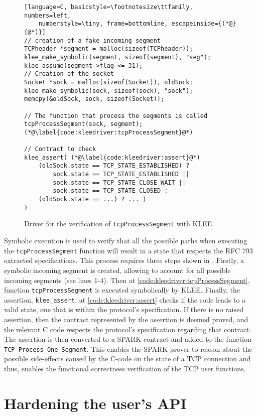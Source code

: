\documentclass[conference]{IEEEtran}
\def\spark#1{\lstinline[language=Ada]{#1}}
\begin{document}
\begin{figure}
\begin{lstlisting}[language=C, basicstyle=\footnotesize\ttfamily, numbers=left,
    numberstyle=\tiny, frame=bottomline, escapeinside={(*@}{@*)}]
// creation of a fake incoming segment
TCPheader *segment = malloc(sizeof(TCPheader));
klee_make_symbolic(segment, sizeof(segment), "seg");
klee_assume(segment->flag <= 31);
// Creation of the socket
Socket *sock = malloc(sizeof(Socket)), oldSock;
klee_make_symbolic(sock, sizeof(sock), "sock");
memcpy(&oldSock, sock, sizeof(Socket));

// The function that process the segments is called
tcpProcessSegment(sock, segment); (*@\label{code:kleedriver:tcpProcessSegment}@*)

// Contract to check
klee_assert( (*@\label{code:kleedriver:assert}@*)
    (oldSock.state == TCP_STATE_ESTABLISHED) ?
        sock.state == TCP_STATE_ESTABLISHED ||
        sock.state == TCP_STATE_CLOSE_WAIT ||
        sock.state == TCP_STATE_CLOSED :
    (oldSock.state == ...) ? ... )
)
\end{lstlisting}
\caption{Driver for the verification of \lstinline[language=C]{tcpProcessSegment}
with KLEE}
\label{code:kleedriver}
\end{figure}

Symbolic execution is used to verify that all the possible paths when executing the \spark{tcpProcessSegment} function will result in a state that respects the RFC 793 extracted specifications. This process requires three steps shown in . Firstly, a symbolic incoming segment is created, allowing to account for all possible incoming segments (see lines 1-4). Then at \cref{code:kleedriver:tcpProcessSegment}, function \texttt{tcpProcessSegment} is executed symbolically by KLEE. Finally, the assertion, \texttt{klee\_assert}, at \cref{code:kleedriver:assert} checks if the code leads to a valid state, one that is within the protocol's specification. If there is no raised assertion, then the contract represented by the assertion is deemed proved, and the relevant C code respects the protocol's specification regarding that contract. The assertion is then converted to a SPARK contract and added to the function \spark{TCP_Process_One_Segment}. This enables the SPARK prover to reason about the possible side-effects caused by the C-code on the state of a TCP connection and thus, enables the functional correctness verification of the TCP user functions. 

\section{Hardening the user's API}
\label{sec:API}
\end{document}

